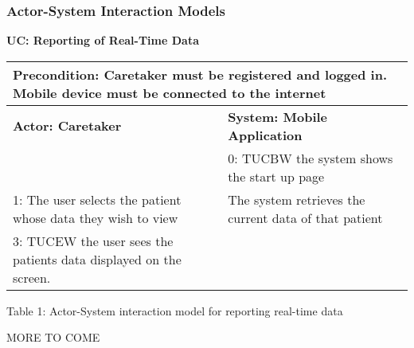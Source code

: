 \subsubsection{Actor-System Interaction Models}
\noindent\textbf{UC: Reporting of Real-Time Data}
				\begin{flushleft}
					\begin{tabular}{ |p{7cm}|p{7cm}| }
   						\hline
  						\multicolumn{2}{|p{\textwidth}|}{\textbf{Precondition:} Caretaker must be registered and logged in. Mobile device must be connected to the internet} \\
 						\hline
						\textbf {Actor: Caretaker} & \textbf{System: Mobile Application}\\
						\hline
						 & 0: TUCBW the system shows the start up page\\
						\hline
 						1: The user selects the patient whose data they wish to view & The system retrieves the current data of that patient\\
						\hline
						3: TUCEW the user sees the patients data displayed on the screen. & \\
  						\hline

				\end{tabular}

			\end{flushleft}
			\begin{center}
    			Table 1: Actor-System interaction model for reporting real-time data
			\end{center}
			
			
			MORE TO COME